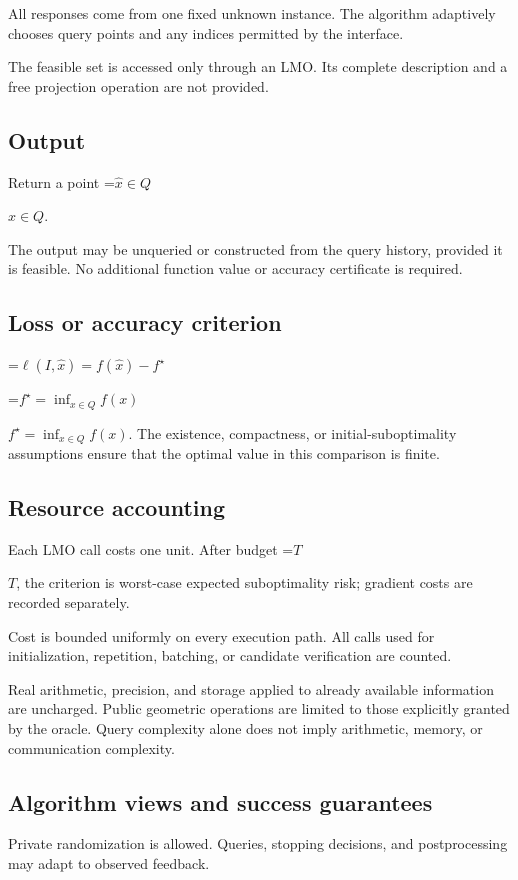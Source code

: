\documentclass[10pt,a4paper]{article}
\newcommand{\AtlasMath}[1]{\par\begingroup\centering\setbox0=\hbox{$\displaystyle #1$}\ifdim\wd0>1.4\linewidth\typeout{ATLAS WIDE FORMULA: \the\wd0}\fi\ifdim\wd0>\linewidth\resizebox{\linewidth}{!}{\box0}\else\box0\fi\par\endgroup}
\newcommand{\AtlasInlineMath}[1]{\begingroup\setbox0=\hbox{$#1$}\ifdim\wd0>.4\linewidth\endgroup\AtlasMath{#1}\else\endgroup$#1$\fi}
\begin{document}
All responses come from one fixed unknown instance. The algorithm adaptively chooses query points and any indices permitted by the interface.

The feasible set is accessed only through an LMO. Its complete description and a free projection operation are not provided.

\subsection{Output}
Return a point \AtlasInlineMath{\widehat x\in Q}.

The output may be unqueried or constructed from the query history, provided it is feasible. No additional function value or accuracy certificate is required.

\subsection{Loss or accuracy criterion}

\AtlasMath{\ell(I,\widehat{x})=f(\widehat{x})-f^\star}


\AtlasInlineMath{f^\star=\inf_{x\in Q}f(x)}. The existence, compactness, or initial-suboptimality assumptions ensure that the optimal value in this comparison is finite.

\subsection{Resource accounting}
Each LMO call costs one unit. After budget \AtlasInlineMath{T}, the criterion is worst-case expected suboptimality risk; gradient costs are recorded separately.

Cost is bounded uniformly on every execution path. All calls used for initialization, repetition, batching, or candidate verification are counted.

Real arithmetic, precision, and storage applied to already available information are uncharged. Public geometric operations are limited to those explicitly granted by the oracle. Query complexity alone does not imply arithmetic, memory, or communication complexity.

\subsection{Algorithm views and success guarantees}
Private randomization is allowed. Queries, stopping decisions, and postprocessing may adapt to observed feedback.
\end{document}

